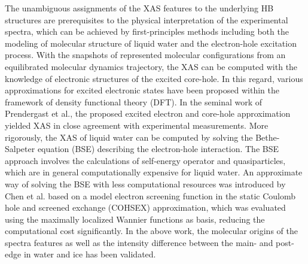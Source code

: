 \documentclass[prb,twocolumn,showpacs,preprintnumbers,superscriptaddress,amsmath,amssymb]{revtex4}
\begin{document}
The unambiguous assignments of the XAS features to the underlying HB structures are prerequisites to
the physical interpretation of the experimental spectra,
which can be achieved by first-principles methods including
both the modeling of
molecular structure of liquid water and the electron-hole excitation process.
With the snapshots of represented molecular configurations from an equilibrated molecular dynamics trajectory,
the XAS can be computed with the knowledge of electronic structures
of the excited core-hole.
In this regard, various approximations\cite{hetenyi2004calculation,cavalleri2004x,giulia2006PRLxas}
for excited electronic states have been proposed within the framework of density functional theory (DFT).\cite{hohenberg64,kohn65}
In the seminal work of Prendergast et al.\cite{giulia2006PRLxas}, the proposed excited electron and core-hole approximation
yielded XAS in close agreement with experimental measurements.
More rigorously, the XAS of liquid water can be computed by solving the Bethe-Salpeter equation (BSE)
describing the electron-hole interaction.\cite{rehr2005final,vinson2011bethe,vinson2012theoretical}
The BSE approach involves the calculations of self-energy operator and quasiparticles,
which are in general computationally expensive for liquid water.
An approximate way of solving the BSE with less computational resources
was introduced by Chen et al.\cite{chen2010PRLxas}
based on a model electron screening function in the static Coulomb hole and screened exchange (COHSEX) approximation\cite{onida2002electronic},
which was evaluated using the maximally localized Wannier functions as basis,\cite{09B-Wu}
reducing the computational cost significantly.
In the above work, the molecular origins of the spectra features as well as 
the intensity difference between the main- and post-edge in water and ice has been validated\cite{chen2010PRLxas}.
\end{document}
